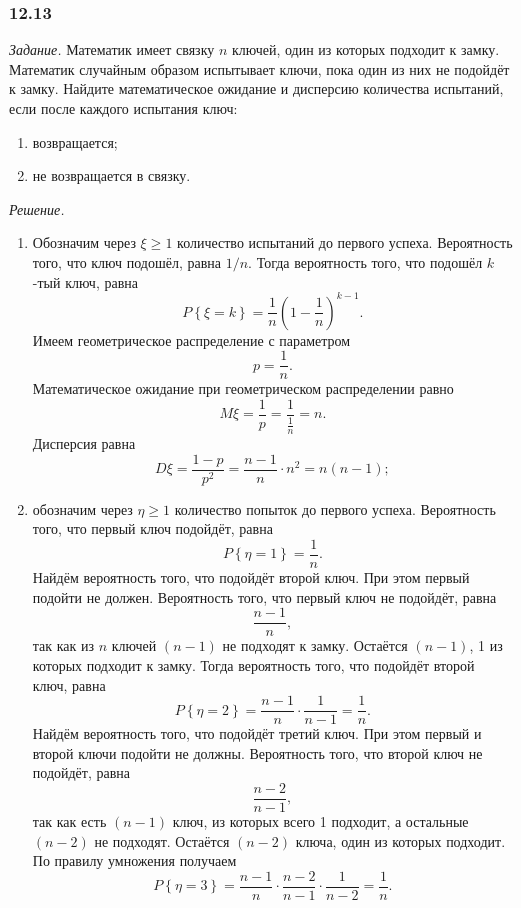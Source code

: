 \subsubsection*{12.13}

\textit{Задание.} Математик имеет связку $n$ ключей, один из которых подходит к замку.
Математик случайным образом испытывает ключи, пока один из них не подойдёт к замку.
Найдите математическое ожидание и дисперсию количества испытаний, если после каждого испытания ключ:
\begin{enumerate}[label=\alph*)]
\item возвращается;
\item не возвращается в связку.
\end{enumerate}

\textit{Решение.}
\begin{enumerate}[label=\alph*)]
\item Обозначим через $ \xi \geq 1$ количество испытаний до первого успеха.
Вероятность того, что ключ подошёл, равна $1/n$.
Тогда вероятность того, что подошёл $k$-тый ключ, равна
$$P \left\{ \xi = k \right\} =
\frac{1}{n} \left( 1 - \frac{1}{n} \right)^{k-1}.$$
Имеем геометрическое распределение с параметром
$$p = \frac{1}{n}.$$
Математическое ожидание при геометрическом распределении равно
$$M \xi =
\frac{1}{p} =
\frac{1}{ \frac{1}{n}} =
n.$$
Дисперсия равна
$$D \xi =
\frac{1-p}{p^2} =
\frac{n-1}{n} \cdot n^2 =
n \left( n-1 \right);$$
\item обозначим через $ \eta \geq 1$ количество попыток до первого успеха.
Вероятность того, что первый ключ подойдёт, равна
$$P \left\{ \eta = 1 \right\} =
\frac{1}{n}.$$
Найдём вероятность того, что подойдёт второй ключ.
При этом первый подойти не должен.
Вероятность того, что первый ключ не подойдёт, равна
$$ \frac{n-1}{n},$$
так как из $n$ ключей $ \left( n-1 \right) $ не подходят к замку.
Остаётся $ \left( n-1 \right) $, 1 из которых подходит к замку. 
Тогда вероятность того, что подойдёт второй ключ, равна
$$P \left\{ \eta = 2 \right\} =
\frac{n-1}{n} \cdot \frac{1}{n-1} =
\frac{1}{n}.$$
Найдём вероятность того, что подойдёт третий ключ.
При этом первый и второй ключи подойти не должны.
Вероятность того, что второй ключ не подойдёт, равна
$$ \frac{n-2}{n-1},$$
так как есть $ \left( n-1 \right) $ ключ, из которых всего 1 подходит, а остальные $ \left( n-2 \right) $ не подходят.
Остаётся $ \left( n-2 \right) $ ключа, один из которых подходит.
По правилу умножения получаем
$$P \left\{ \eta = 3 \right\} =
\frac{n-1}{n} \cdot \frac{n-2}{n-1} \cdot \frac{1}{n-2} =
\frac{1}{n}.$$

\end{enumerate}
